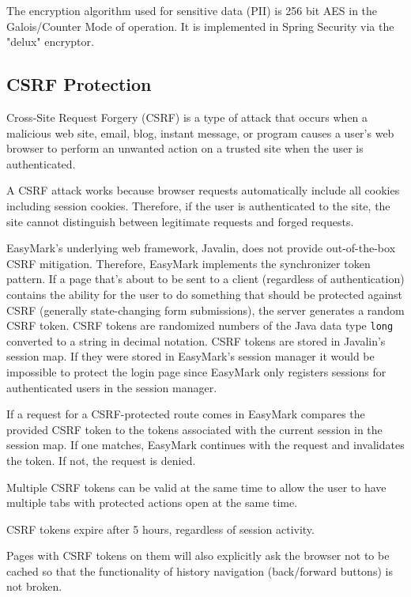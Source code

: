 \documentclass[12pt,a4paper,oneside]{report}
\newcommand{\BlockCite}[2]{
	\begin{addmargin}[1cm]{0pt}
		#1

		\fullcite{#2}
	\end{addmargin}
}
\begin{document}
	The encryption algorithm used for sensitive data (PII) is 256 bit AES in the Galois/Counter Mode of operation. It is implemented in Spring Security via the "delux" encryptor\parencite{springdocssecurityencryptors}.

	\subsection{CSRF Protection} \label{subsec:csrfprotection}
	\BlockCite{
		Cross-Site Request Forgery (CSRF) is a type of attack that occurs when a malicious web site, email, blog, instant message, or program causes a user's web browser to perform an unwanted action on a trusted site when the user is authenticated.

		A CSRF attack works because browser requests automatically include all cookies including session cookies. Therefore, if the user is authenticated to the site, the site cannot distinguish between legitimate requests and forged requests.
	}{owaspcsrfcheatsheet}

	EasyMark's underlying web framework, Javalin, does not provide out-of-the-box CSRF mitigation. Therefore, EasyMark implements the synchronizer token pattern. If a page that's about to be sent to a client (regardless of authentication) contains the ability for the user to do something that should be protected against CSRF (generally state-changing form submissions), the server generates a random CSRF token. CSRF tokens are randomized numbers of the Java data type \lstinline|long| converted to a string in decimal notation. CSRF tokens are stored in Javalin's session map. If they were stored in EasyMark's session manager it would be impossible to protect the login page since EasyMark only registers sessions for authenticated users in the session manager.

	If a request for a CSRF-protected route comes in EasyMark compares the provided CSRF token to the tokens associated with the current session in the session map. If one matches, EasyMark continues with the request and invalidates the token. If not, the request is denied.

	Multiple CSRF tokens can be valid at the same time to allow the user to have multiple tabs with protected actions open at the same time.

	CSRF tokens expire after 5 hours, regardless of session activity.

	Pages with CSRF tokens on them will also explicitly ask the browser not to be cached so that the functionality of history navigation (back/forward buttons) is not broken.
\end{document}
